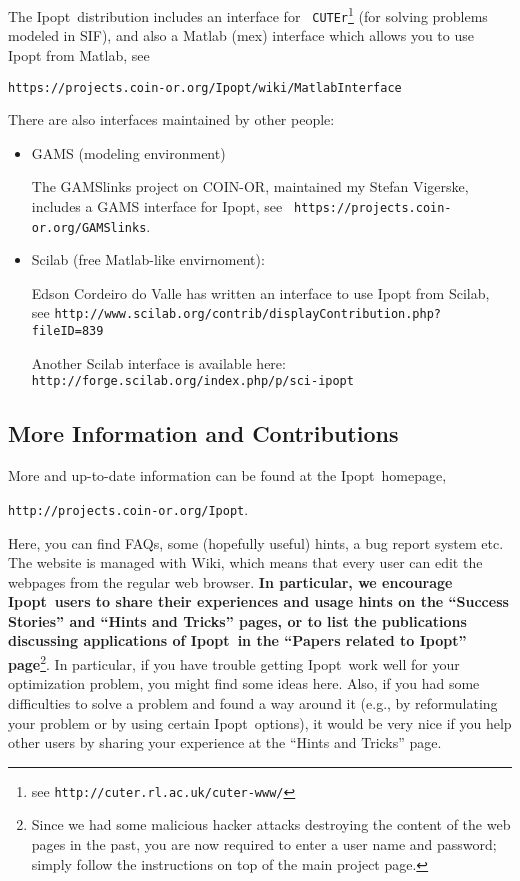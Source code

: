 \documentclass[10pt]{article}
\newcommand{\Ipopt}{{\sc Ipopt}}
\begin{document}
The \Ipopt\ distribution includes an interface for {\tt
  CUTEr}\footnote{see {\tt http://cuter.rl.ac.uk/cuter-www/}} (for
  solving problems modeled in SIF), and also a Matlab (mex) interface
  which allows you to use Ipopt from Matlab, see

\centerline{\tt https://projects.coin-or.org/Ipopt/wiki/MatlabInterface}


There are also interfaces maintained by other people:
\begin{itemize}
\item GAMS (modeling environment)

  The GAMSlinks project on COIN-OR, maintained my Stefan Vigerske,
  includes a GAMS interface for Ipopt, see {\tt
  https://projects.coin-or.org/GAMSlinks}.
\item Scilab (free Matlab-like envirnoment):

  Edson Cordeiro do Valle has written an interface to use Ipopt from
  Scilab,\\ see {\tt http://www.scilab.org/contrib/displayContribution.php?fileID=839}

  Another Scilab interface is available here: {\tt
    http://forge.scilab.org/index.php/p/sci-ipopt}
\end{itemize}

\subsection{More Information and Contributions}
More and up-to-date information can be found at the \Ipopt\ homepage,

\begin{center}
\texttt{http://projects.coin-or.org/Ipopt}.
\end{center}

Here, you can find FAQs, some (hopefully useful) hints, a bug report
system etc.  The website is managed with Wiki, which means that every
user can edit the webpages from the regular web browser.  {\bf In
  particular, we encourage \Ipopt\ users to share their experiences
  and usage hints on the ``Success Stories'' and ``Hints and Tricks''
  pages, or to list the publications discussing applications of
  \Ipopt\ in the ``Papers related to Ipopt'' page}\footnote{Since we
  had some malicious hacker attacks destroying the content of the web
  pages in the past, you are now required to enter a user name and
  password; simply follow the instructions on top of the main project
  page.}.  In particular, if you have trouble getting \Ipopt\ work
well for your optimization problem, you might find some ideas here.
Also, if you had some difficulties to solve a problem and found a way
around it (e.g., by reformulating your problem or by using certain
\Ipopt\ options), it would be very nice if you help other users by
sharing your experience at the ``Hints and Tricks'' page.
\end{document}

